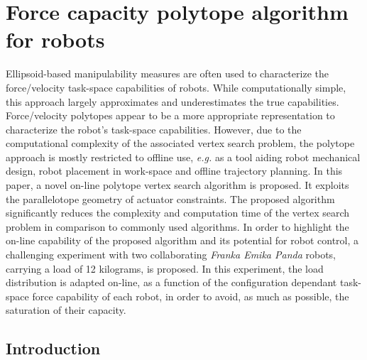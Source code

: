 

\newcommand{\onum}[1]{\overline{{#1}}} 	%
\newcommand{\unum}[1]{\underline{{#1}}}  	%

\chapter{Force capacity polytope algorithm for robots}

Ellipsoid-based manipulability measures are often used to characterize the force/velocity task-space capabilities of robots. While computationally simple, this approach largely approximates and underestimates the true capabilities. Force/velocity polytopes appear to be a more appropriate representation to characterize the robot's task-space capabilities. However, due to the computational complexity of the associated vertex search problem, the polytope approach is mostly restricted to  offline use, \textit{e.g.} as a tool aiding robot mechanical design, robot placement in work-space and offline trajectory planning. In this paper, a novel on-line polytope vertex search algorithm is proposed. It exploits the parallelotope geometry of actuator constraints. The proposed algorithm significantly reduces the complexity and computation time of the vertex search problem in comparison to commonly used algorithms. In order to highlight the on-line capability of the proposed algorithm and its potential for robot control, a challenging experiment with two collaborating \textit{Franka Emika Panda} robots, carrying a load of 12 kilograms, is proposed. In this experiment, the load distribution is adapted on-line, as a function of the configuration dependant task-space force capability of each robot, in order to avoid, as much as possible, the saturation of their capacity.


\section{Introduction}

